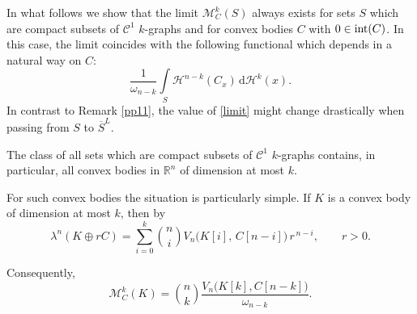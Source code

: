 \documentclass[pdflatex,sn-mathphys-num]{sn-jnl}
\theoremstyle{plain}
\theoremstyle{definition}
\DeclareMathOperator{\inter}{\textup{int}}
\newcommand{\dH}[1]{\,\mathrm d\mathcal{H}^{#1}}
\begin{document}
\medskip 

In what follows we show that the limit $\mathcal{M}_C^k(S)$ always exists for sets $S$ which are compact subsets of $\mathcal{C}^1$ $k$-graphs and for convex bodies $C$ with $0\in\inter(C)$. In this case, the limit coincides with the following functional which depends in a natural way on $C$: \begin{equation}\label{limit}
\frac{1}{\omega_{n-k}}\int\limits_{S}\mathcal{H}^{n-k}(C_x)\dH{k}(x).
\end{equation} 
In contrast to Remark \ref{pp11}, the value of \eqref{limit} might change drastically when passing from $S$ to $\overline{S}^L$.

\medskip

The class of all sets which are compact subsets of $\mathcal{C}^1$ $k$-graphs contains, in particular, all convex bodies in $\mathbb{R}^n$ of dimension at most $k$.

For such convex bodies the situation is particularly simple.
If $K$ is a convex body of dimension at most $k$, then by \cite[Ch. 5]{rolf}
\begin{equation}\label{pp1}
    \lambda^n(K\oplus rC)
=\sum_{i=0}^k \binom{n}{i} V_n\bigl(K[i],\,C[n-i]\bigr)\,r^{\,n-i},\qquad r>0.
\end{equation}

Consequently,
\begin{equation}\label{pp3}
    \mathcal{M}^k_{C}(K)
=\binom{n}{k}\frac{V_n\bigl(K[k], C[n-k]\bigr)}{\omega_{n-k}}.
\end{equation}
\end{document}
